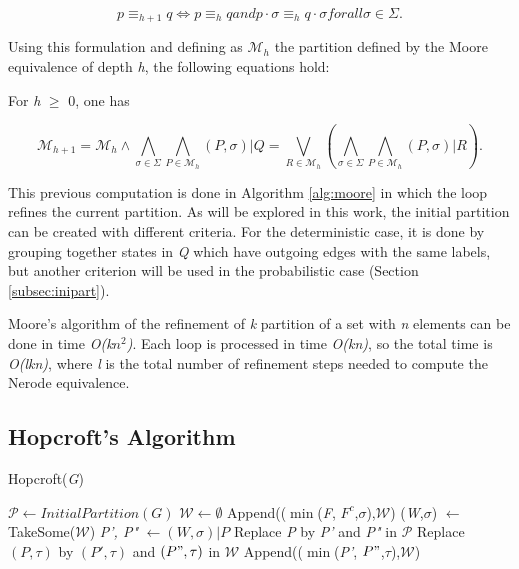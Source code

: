 {\begin{proposition}
\end{proposition}

\[
p \equiv_{h+1} q \Longleftrightarrow p \equiv_{h} q and p\cdot \sigma \equiv_h q\cdot \sigma for all \sigma \in \Sigma.
\]

Using this formulation and defining as $\mathcal{M}_h$ the partition defined by the Moore equivalence of depth \textit{h}, the following equations hold:

\begin{proposition}\label{prop:moorecomp}
For \textit{h} $\geq$ 0, one has

\end{proposition}

\[
\mathcal{M}_{h+1} = \mathcal{M}_h \wedge \bigwedge_{\sigma\in\Sigma} \bigwedge_{P\in\mathcal{M}_h}(P,\sigma)|Q = \bigvee_{R\in\mathcal{M}_h} (\bigwedge_{\sigma\in\Sigma} \bigwedge_{P\in\mathcal{M}_h}(P,\sigma)|R).
\]

This previous computation is done in Algorithm \ref{alg:moore} in which the loop refines the current partition. As will be explored in this work, the initial partition can be created with different criteria. For the deterministic case, it is done by grouping together states in \textit{Q} which have outgoing edges with the same labels, but another criterion will be used in the probabilistic case (Section \ref{subsec:inipart}).

Moore's algorithm of the refinement of \textit{k} partition of a set with \textit{n} elements can be done in time \textit{O(k$n^2$)}. Each loop is processed in time \textit{O(kn)}, so the total time is \textit{O(lkn)}, where \textit{l} is the total number of refinement steps needed to compute the Nerode equivalence.

\subsection{Hopcroft's Algorithm}

\begin{algorithm} 
  \caption{Hopcroft(\textit{G})\label{alg:hop}}
    \begin{algorithmic}[1]
      \State $\mathcal{P} \leftarrow InitialPartition(G)$
      \State $\mathcal{W} \leftarrow \emptyset$
      \ForAll{$\sigma \in \Sigma$}
      	\State Append(($\min$(\textit{F}, $F^c$,$\sigma$),$\mathcal{W}$)
      		\State (\textit{W},$\sigma$) $\leftarrow$ TakeSome($\mathcal{W}$)
				\State \textit{P', P"} $\leftarrow (W,\sigma)|P$      		
				Replace \textit{P} by \textit{P'} and \textit{P"} in $\mathcal{P}$
				\ForAll{$\tau \in \Sigma$}
						\State Replace $(P,\tau)$ by $(P',\tau)$ and $(P",\tau)$ in $\mathcal{W}$
					\Else
						\State Append(($\min$(\textit{P'}, $P"$,$\tau$),$\mathcal{W}$)				
					\EndIf				
				\EndFor 
      		\EndFor
      	\EndWhile
      \EndFor
    \end{algorithmic}
  \end{algorithm}

}
